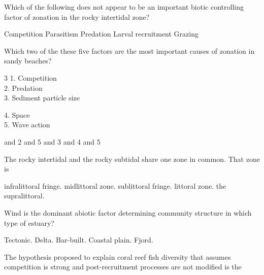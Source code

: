 
\question
Which of the following does not appear to be an important biotic controlling factor of zonation in the rocky intertidal zone?

\begin{choices}
\choice  Competition  
\correctchoice Parasitism 
\choice Predation 
\choice Larval recruitment 
\choice Grazing 
\end{choices}

\question
Which two of the these five factors are the most important causes of zonation in sandy beaches?
\begin{multicols}{3}
1. Competition \\
2. Predation \\
3. Sediment particle size\\

\columnbreak

4. Space\\
5. Wave action\\
\phantom{6.} \null

\columnbreak

\phantom{7.}\null

\end{multicols}\vspace*{-1\baselineskip}

\begin{choices}
 and 2 
 and 5 
 and 3  
 and 4 
 and 5 
\end{choices}

\question
The rocky intertidal and the rocky subtidal share one zone in common. That zone is

\begin{choices}
\choice infralittoral fringe.
\choice midlittoral zone.
\choice sublittoral fringe.
\choice littoral zone.
\correctchoice the supralittoral.
\end{choices}

\question
Wind is the dominant abiotic factor determining community structure in which type of estuary?

\begin{choices}
\choice Tectonic. 
\choice Delta. 
\correctchoice Bar-built. 
\choice Coastal plain. 
\choice Fjord. 
\end{choices}

\newpage

\question
The hypothesis proposed to explain coral reef fish diversity that assumes competition is strong and post-recruitment processes are not modified is the 


